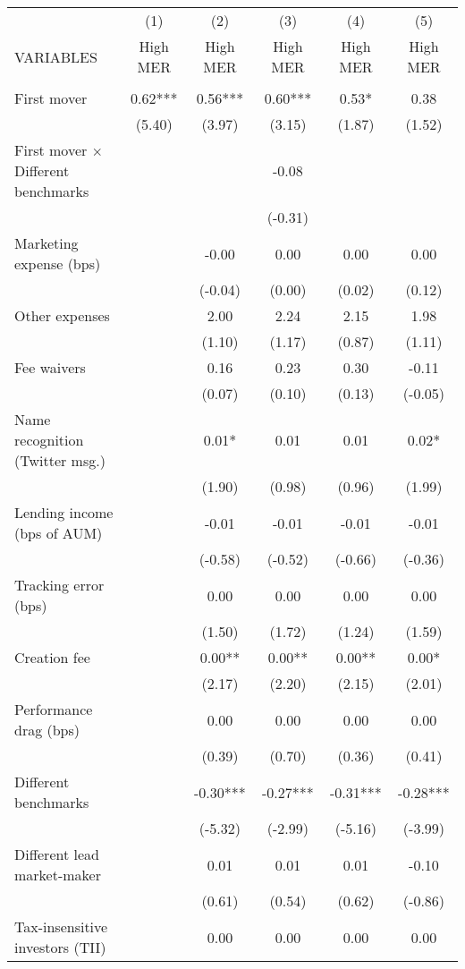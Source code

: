 \documentclass[]{article}
\begin{document}
\begin{tabular}{lccccc} \hline
 & (1) & (2) & (3) & (4) & (5) \\
VARIABLES & High MER & High MER & High MER & High MER & High MER \\ \hline
 &  &  &  &  &  \\
First mover & 0.62*** & 0.56*** & 0.60*** & 0.53* & 0.38 \\
 & (5.40) & (3.97) & (3.15) & (1.87) & (1.52) \\
First mover $\times$ Different benchmarks &  &  & -0.08 &  &  \\
 &  &  & (-0.31) &  &  \\
Marketing expense (bps) &  & -0.00 & 0.00 & 0.00 & 0.00 \\
 &  & (-0.04) & (0.00) & (0.02) & (0.12) \\
Other expenses &  & 2.00 & 2.24 & 2.15 & 1.98 \\
 &  & (1.10) & (1.17) & (0.87) & (1.11) \\
Fee waivers &  & 0.16 & 0.23 & 0.30 & -0.11 \\
 &  & (0.07) & (0.10) & (0.13) & (-0.05) \\
Name recognition (Twitter msg.) &  & 0.01* & 0.01 & 0.01 & 0.02* \\
 &  & (1.90) & (0.98) & (0.96) & (1.99) \\
Lending income (bps of AUM) &  & -0.01 & -0.01 & -0.01 & -0.01 \\
 &  & (-0.58) & (-0.52) & (-0.66) & (-0.36) \\
Tracking error (bps) &  & 0.00 & 0.00 & 0.00 & 0.00 \\
 &  & (1.50) & (1.72) & (1.24) & (1.59) \\
Creation fee &  & 0.00** & 0.00** & 0.00** & 0.00* \\
 &  & (2.17) & (2.20) & (2.15) & (2.01) \\
Performance drag (bps) &  & 0.00 & 0.00 & 0.00 & 0.00 \\
 &  & (0.39) & (0.70) & (0.36) & (0.41) \\
Different benchmarks &  & -0.30*** & -0.27*** & -0.31*** & -0.28*** \\
 &  & (-5.32) & (-2.99) & (-5.16) & (-3.99) \\
Different lead market-maker &  & 0.01 & 0.01 & 0.01 & -0.10 \\
 &  & (0.61) & (0.54) & (0.62) & (-0.86) \\
Tax-insensitive investors (TII) &  & 0.00 & 0.00 & 0.00 & 0.00 \\

\end{tabular}
\end{document}
